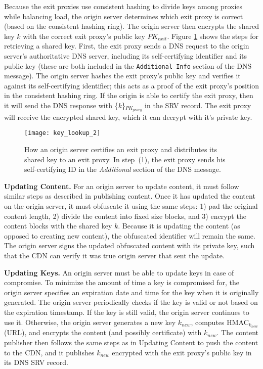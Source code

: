 Because the exit proxies use consistent hashing to divide keys among proxies while
balancing load, the origin server
determines which exit proxy is correct (based on the consistent hashing ring). 
The origin server then encrypts the
shared key $k$ with the correct exit proxy's public key $PK_{exit}$.  
Figure \ref{fig:keys} shows the steps for retrieving a shared key.  First, the
exit proxy sends a DNS request to the origin server's authoritative DNS server, including its self-certifying
identifier and its public key (these are both included in the {\tt Additional Info} section of the DNS message).  The origin server hashes the exit 
proxy's public key and verifies it against its self-certifying identifier; this acts as a proof of the 
exit proxy's position in the consistent hashing ring.  If the origin is able to
certify the exit proxy, then it will send the DNS response with
\{$k$\}$_{PK_{proxy}}$ in the SRV record. The exit proxy will receive the encrypted shared key, which it can decrypt with it's private key.

\begin{figure}[t]
\centering
\texttt{[image: key\_lookup\_2]}
\caption{How an origin server certifies an exit proxy and distributes its shared
key to an exit proxy.  In step~(1), 
the exit proxy sends his self-certifying ID in the {\it Additional} section of the DNS message.  }
\label{fig:keys}
\end{figure}

\textbf{Updating Content.}
For an origin server to update content, it must follow similar steps as described
in publishing content.  
Once it has updated the content on the origin server, it must obfuscate it using
the same steps: 1) pad the 
original content length, 2) divide the content into fixed size blocks, and 3) encrypt the content blocks 
with the shared key $k$.  Because it is updating the content (as opposed to creating
new content), the 
obfuscated identifier will remain the same.  The origin server signs the updated obfuscated content with 
its private key, such that the CDN can verify it was true origin server that sent
the update.

\textbf{Updating Keys.}
An origin server must be able to update keys in case of compromise.  To minimize the amount of time a key is compromised for, the 
origin server specifies an expiration date and time for the key when it is originally generated.  The origin server 
periodically checks if the key is valid or not based on the expiration timestamp.  If the key is still valid, the origin server 
continues to use it.  Otherwise, the origin server generates a new key $k_{new}$, computes HMAC$_{k_{new}}$(URL), and 
encrypts the content (and possibly certificate) with $k_{new}$.  The content publisher then follows the same steps as in Updating 
Content to push the content to the CDN, and it publishes $k_{new}$ encrypted with the exit proxy's public key in its DNS SRV record.

